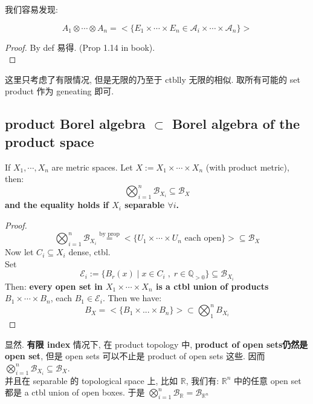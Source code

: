 \documentclass[lang=cn,11pt]{elegantbook}
\begin{document}
我们容易发现:
\begin{proposition}
$$A_1 \otimes \cdots \otimes A_n = <\{  E_1\times \cdots \times E_n \in \mathcal{A}_i \times \cdots \times \mathcal{A}_n  \}>$$
\end{proposition}
\begin{proof}
    By def 易得. (Prop 1.14 in book).\\
\end{proof}
\begin{remark}
  这里只考虑了有限情况, 但是无限的乃至于 ctblly 无限的相似. 取所有可能的 set product 作为 geneating 即可.
\end{remark}



\subsection{product Borel algebra $\subset$ Borel algebra of the product space}
\begin{proposition}
    If $X_1,\cdots, X_n $ are metric spaces. Let $X := X_1 \times \cdots \times X_n$ (with product metric), then: $$\bigotimes_{i=1}^n \mathcal{B}_{X_i} \subseteq \mathcal{B}_X$$
\textbf{and the equality holds if $X_i$ separable $\forall i$.}
\end{proposition}
\begin{proof}
   $$\bigotimes_{i=1}^n \mathcal{B}_{X_i}  \overset{\text{by prop}}{=} < \{ U_1\times \cdots \times U_n  \text{ each open} \} > \subseteq\mathcal{B}_X $$
   Now let $C_i \subseteq X_i$ dense, ctbl. \\
   Set $$\mathcal{E}_i  := \{  B_r(x) \mid x\in C_i \;,\; r\in \mathbb{Q}_{>0}  \} \subseteq \mathcal{B}_{X_i} $$
   Then: \textbf{every open set in $X_1 \times \cdots \times X_n$ is a ctbl union of products $B_1 \times \cdots \times B_n$}, each $B_1 \in \mathcal{E}_i$.
   Then we have: $$B_X = <\{B_1 \times ...\times B_n\}> \subset \bigotimes_1^n B_{X_i}$$
\end{proof}
\begin{remark}
    显然. \textbf{有限 index} 情况下, 在 product topology 中, \textbf{product of open sets仍然是 open set}, 但是 open sets 可以不止是 product of open sets 这些. 因而 \(\bigotimes_{i=1}^n \mathcal{B}_{X_i} \subseteq \mathcal{B}_X\). \\
 并且在 separable 的 topological space 上, 比如 $\mathbb{R}$, 我们有: $\mathbb{R}^n$ 中的任意 open set 都是 a ctbl union of open boxes. 于是 \(\bigotimes_{i=1}^n \mathcal{B}_{\mathbb{R}}  = \mathcal{B}_{\mathbb{R}^n}\)
\end{remark}
\end{document}
